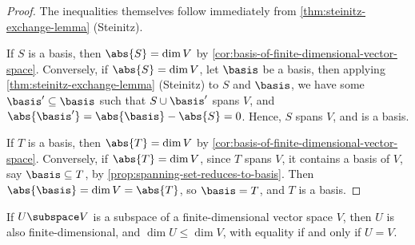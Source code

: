 \begin{proof}
    The inequalities themselves follow immediately from \autoref{thm:steinitz-exchange-lemma} (Steinitz).

    If \(S\) is a basis, then \(\abs{S} = \dim V\) by \autoref{cor:basis-of-finite-dimensional-vector-space}. Conversely, if \(\abs{S} = \dim V\), let \(\basis\) be a basis, then applying \autoref{thm:steinitz-exchange-lemma} (Steinitz) to \(S\) and \(\basis\), we have some \(\basis' \subseteq \basis\) such that \(S \cup \basis'\) spans \(V\), and \(\abs{\basis'} = \abs{\basis} - \abs{S} = 0\). Hence, \(S\) spans \(V\), and is a basis.

    If \(T\) is a basis, then \(\abs{T} = \dim V\) by \autoref{cor:basis-of-finite-dimensional-vector-space}. Conversely, if \(\abs{T} = \dim V\), since \(T\) spans \(V\), it contains a basis of \(V\), say \(\basis \subseteq T\), by \autoref{prop:spanning-set-reduces-to-basis}. Then \(\abs{\basis} = \dim V = \abs{T}\), so \(\basis = T\), and \(T\) is a basis.
\end{proof}

\begin{proposition}
    If \(U \subspace V\) is a subspace of a finite-dimensional vector space \(V\), then \(U\) is also finite-dimensional, and \(\dim U \leq \dim V\), with equality if and only if \(U = V\).
\end{proposition}

